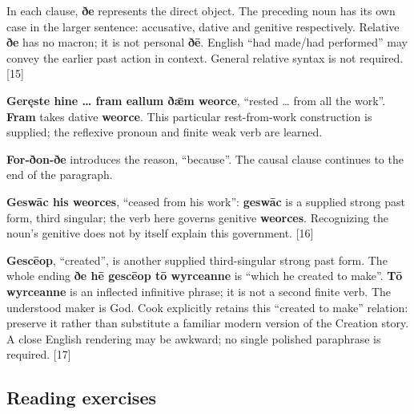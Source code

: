 In each clause, \textbf{ðe} represents the direct object. The preceding noun has its own case in the larger sentence: accusative, dative and genitive respectively. Relative \textbf{ðe} has no macron; it is not personal \textbf{ðē}. English “had made/\allowbreak{}had performed” may convey the earlier past action in context. General relative syntax is not required. [15]

\textbf{Geręste hine … fram eallum ðǣm weorce}, “rested … from all the work”. \textbf{Fram} takes dative \textbf{weorce}. This particular rest-from-work construction is supplied; the reflexive pronoun and finite weak verb are learned.

\textbf{For-ðon-ðe} introduces the reason, “because”. The causal clause continues to the end of the paragraph.

\textbf{Geswāc his weorces}, “ceased from his work”: \textbf{geswāc} is a supplied strong past form, third singular; the verb here governs genitive \textbf{weorces}. Recognizing the noun’s genitive does not by itself explain this government. [16]

\textbf{Gescēop}, “created”, is another supplied third-singular strong past form. The whole ending \textbf{ðe hē gescēop tō wyrceanne} is “which he created to make”. \textbf{Tō wyrceanne} is an inflected infinitive phrase; it is not a second finite verb. The understood maker is God. Cook explicitly retains this “created to make” relation: preserve it rather than substitute a familiar modern version of the Creation story. A close English rendering may be awkward; no single polished paraphrase is required. [17]

\subsection*{Reading exercises}

\par\begin{minipage}{\linewidth}\raggedright

\end{minipage}\par\addvspace{4pt}

